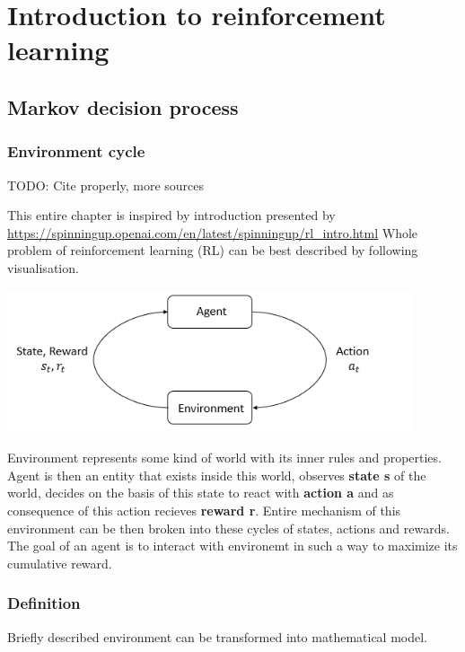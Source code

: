 \chapter{Introduction to reinforcement learning}

\section{Markov decision process}
\subsection*{Environment cycle}
TODO: Cite properly, more sources

This entire chapter is inspired by introduction presented by \url{https://spinningup.openai.com/en/latest/spinningup/rl_intro.html}
Whole problem of reinforcement learning (RL) can be best described by following visualisation.

\includegraphics*[width=12cm]{rl_diagram_transparent_bg.png}

Environment represents some kind of world with its inner rules and properties. 
Agent is then an entity that exists inside this world, observes \textbf{state s} of the world, decides on the basis of this state to react with \textbf{action a} and as consequence of this action recieves \textbf{reward r}.
Entire mechanism of this environment can be then broken into these cycles of states, actions and rewards.
The goal of an agent is to interact with environemt in such a way to maximize its cumulative reward.

\subsection*{Definition}
Briefly described environment can be transformed into mathematical model.

